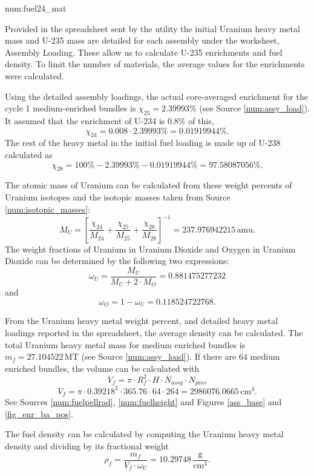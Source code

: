 \begin{numitem}{num:fuel24_mat}
  
   Provided in the spreadsheet sent by the utility the initial Uranium heavy metal mass and U-235 mass are detailed for each assembly under the worksheet, Assembly Loading. These allow us to calculate U-235 enrichments and fuel density. To limit the number of materials, the average values for the enrichments were calculated. 
   
   Using the detailed assembly loadings, the actual core-averaged enrichment for the cycle 1 medium-enriched bundles is $\chi_{25} = 2.39993\%$ (see Source \ref{num:assy_load}). It assumed that the enrichment of U-234 is 0.8\% of this,
\[
    \chi_{24} = 0.008\cdot 2.39993\% = 0.01919944\%.
\]
    The rest of the heavy metal in the initial fuel loading is made up of U-238 calculated as
\[
    \chi_{28} = 100\% - 2.39993\% - 0.01919944\% = 97.58087056\%.
\]

The atomic mass of Uranium can be calculated from these weight percents of Uranium isotopes and the isotopic masses taken from Source \ref{num:isotopic_masses}:
\[
    M_U = \left[ \frac{\chi_{24}}{M_{24}} + \frac{\chi_{25}}{M_{25}} + \frac{\chi_{28}}{M_{28}} \right ]^{-1} = 237.976942215\,\mathrm{amu}. 
\]
The weight fractions of Uranium in Uranium Dioxide and Oxygen in Uranium Dioxide can be determined by the following two expressions:
\[
    \omega_{U} = \frac{M_U}{M_U + 2\cdot M_O} = 0.881475277232 
\]
and
\[
    \omega_{O} = 1 - \omega_{U} = 0.118524722768. 
\]

From the Uranium heavy metal weight percent, and detailed heavy metal loadings reported in the spreadsheet, the average density can be calculated. The total Uranium heavy metal mass for medium enriched bundles is $m_f = 27.104522\,\mathrm{MT}$ (see Source \ref{num:assy_load}).  If there are 64 medium enriched bundles, the volume can be calculated with
\[
    V_f = \pi \cdot R_f^2 \cdot H \cdot N_{assy} \cdot N_{pins}
\]
\[
    V_f = \pi \cdot 0.39218^2 \cdot 365.76 \cdot 64 \cdot 264 = 2986076.0665\,\mathrm{cm^3}.
\]
See Sources \ref{num:fuelpellrad}, \ref{num:fuelheight} and Figures \ref{ass_base} and \ref{fig_enr_ba_pos}.

The fuel density can be calculated by computing the Uranium heavy metal density and dividing by its fractional weight
\[
    \rho_f = \frac{m_f}{V_f\cdot\omega_{U}} = 10.29748\,\mathrm{\frac{g}{cm^3}}.
\]


\end{numitem}
